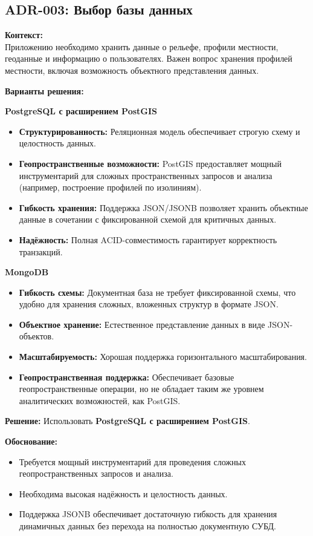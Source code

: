 \documentclass[a4paper,12pt]{article}
\begin{document}
\subsection{ADR-003: Выбор базы данных}

\textbf{Контекст:}\\
Приложению необходимо хранить данные о рельефе, профили местности, геоданные и информацию о пользователях. Важен вопрос хранения профилей местности, включая возможность объектного представления данных.

\textbf{Варианты решения:}

\textbf{PostgreSQL с расширением PostGIS}
\begin{itemize}[leftmargin=1.5cm]
    \item \textbf{Структурированность:} Реляционная модель обеспечивает строгую схему и целостность данных.
    \item \textbf{Геопространственные возможности:} PostGIS предоставляет мощный инструментарий для сложных пространственных запросов и анализа (например, построение профилей по изолиниям).
    \item \textbf{Гибкость хранения:} Поддержка JSON/JSONB позволяет хранить объектные данные в сочетании с фиксированной схемой для критичных данных.
    \item \textbf{Надёжность:} Полная ACID-совместимость гарантирует корректность транзакций.
\end{itemize}

\textbf{MongoDB}
\begin{itemize}[leftmargin=1.5cm]
    \item \textbf{Гибкость схемы:} Документная база не требует фиксированной схемы, что удобно для хранения сложных, вложенных структур в формате JSON.
    \item \textbf{Объектное хранение:} Естественное представление данных в виде JSON-объектов.
    \item \textbf{Масштабируемость:} Хорошая поддержка горизонтального масштабирования.
    \item \textbf{Геопространственная поддержка:} Обеспечивает базовые геопространственные операции, но не обладает таким же уровнем аналитических возможностей, как PostGIS.
\end{itemize}

\textbf{Решение:} Использовать \textbf{PostgreSQL с расширением PostGIS}.

\textbf{Обоснование:}
\begin{itemize}
    \item Требуется мощный инструментарий для проведения сложных геопространственных запросов и анализа.
    \item Необходима высокая надёжность и целостность данных.
    \item Поддержка JSONB обеспечивает достаточную гибкость для хранения динамичных данных без перехода на полностью документную СУБД.
\end{itemize}
\end{document}
